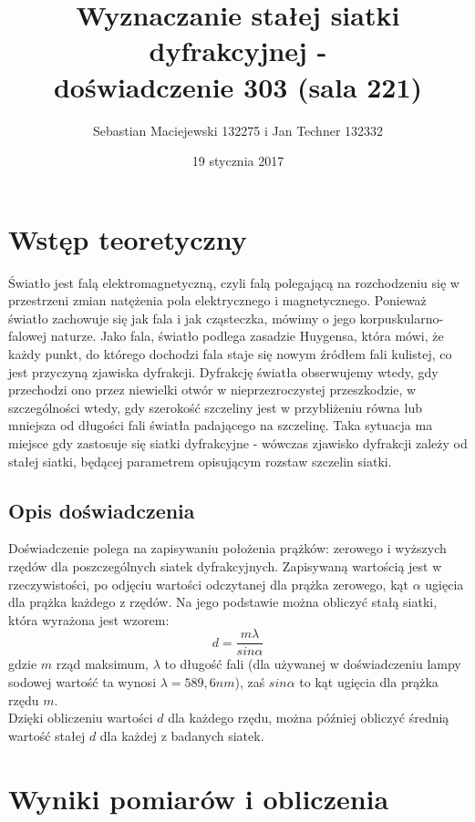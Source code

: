 \documentclass[10pt,a4paper]{article}
\author{Sebastian Maciejewski 132275 i Jan Techner 132332}
\title{Wyznaczanie stałej siatki dyfrakcyjnej - \\ doświadczenie 303 (sala 221)}
\date{19 stycznia 2017}
\newcommand{\forceindent}{\leavevmode{\parindent=3em\indent}}
\begin{document}
\maketitle
\section{Wstęp teoretyczny}
\forceindent Światło jest falą elektromagnetyczną, czyli falą polegającą na rozchodzeniu się w przestrzeni zmian natężenia pola elektrycznego i magnetycznego. Ponieważ światło 
zachowuje się jak fala i jak cząsteczka, mówimy o jego korpuskularno-falowej naturze. Jako fala, światło podlega zasadzie Huygensa, która mówi, że każdy punkt, do którego dochodzi fala
staje się nowym źródłem fali kulistej, co jest przyczyną zjawiska dyfrakcji. Dyfrakcję światła obserwujemy wtedy, gdy przechodzi ono przez niewielki otwór w nieprzezroczystej przeszkodzie, 
w szczególności wtedy, gdy szerokość szczeliny jest w przybliżeniu równa lub mniejsza od długości fali światła padającego na szczelinę.
Taka sytuacja ma miejsce gdy zastosuje się siatki dyfrakcyjne - wówczas zjawisko dyfrakcji zależy od stałej siatki, będącej parametrem opisującym rozstaw szczelin siatki.

\subsection*{Opis doświadczenia}
\forceindent Doświadczenie polega na zapisywaniu położenia prążków: zerowego i wyższych rzędów dla poszczególnych siatek dyfrakcyjnych. Zapisywaną wartością jest w rzeczywistości,
po odjęciu wartości odczytanej dla prążka zerowego, kąt $\alpha$ ugięcia dla prążka każdego z rzędów. Na jego podstawie można obliczyć stałą siatki, która wyrażona jest wzorem:
\begin{equation}
d=\frac{m\lambda}{sin\alpha}
\end{equation}
gdzie $m$ rząd maksimum, $\lambda$ to długość fali (dla używanej w doświadczeniu lampy sodowej wartość ta wynosi $\lambda = 589,6nm$), zaś $sin\alpha$ to kąt ugięcia dla prążka rzędu $m$.\\
Dzięki obliczeniu wartości $d$ dla każdego rzędu, można później obliczyć średnią wartość stałej $d$ dla każdej z badanych siatek.

\newpage
\section{Wyniki pomiarów i obliczenia}
\end{document}
